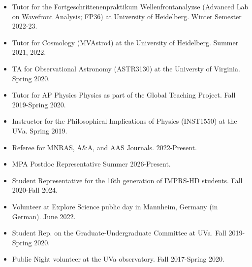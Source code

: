 \documentclass[a4paper,12pt,oneside]{article}
\begin{document}
\begin{itemize}[wide, labelwidth=!, labelindent=-11pt, noitemsep]
    \item Tutor for the Fortgeschrittenenpraktikum Wellenfrontanalyzse (Advanced Lab on Wavefront Analysis; FP36) at University of Heidelberg. Winter Semester 2022-23.
    \item Tutor  for Cosmology (MVAstro4) at the University of Heidelberg. Summer 2021, 2022.
    \item TA for Observational Astronomy (ASTR3130) at the Universty of Virginia. Spring 2020.
    \item Tutor for AP Physics Physics as part of the Global Teaching Project. Fall 2019-Spring 2020.
    \item Instructor for the Philosophical Implications of Physics (INST1550) at the UVa. Spring 2019.
\end{itemize}

\noindent{}

\begin{itemize}[wide, labelwidth=!, labelindent=-11pt, noitemsep]
    \item Referee for MNRAS, A\&A, and AAS Journals. 2022-Present.
    \item MPA Postdoc Representative Summer 2026-Present.
    \item Student Representative for the 16th generation of IMPRS-HD students. Fall 2020-Fall 2024. 
    \item Volunteer at Explore Science public day in Mannheim, Germany (in German). June 2022.
    \item Student Rep. on the Graduate-Undergraduate Committee at UVa. Fall 2019-Spring 2020.
    \item Public Night volunteer at the UVa observatory. Fall 2017-Spring 2020.
\end{itemize}
\end{document}
